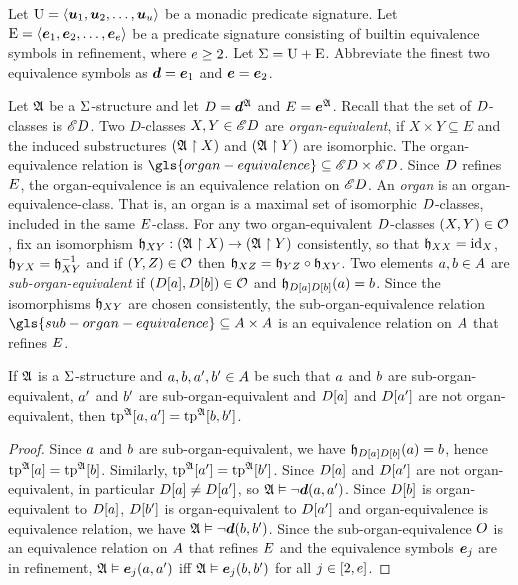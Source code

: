 Let $\mathrm{U} = \left\langle \bm{u}_{1},\bm{u}_{2},\dots,\bm{u}_{u} \right\rangle$ be a monadic predicate signature.
Let $\mathrm{E} = \left\langle \bm{e}_{1},\bm{e}_{2},\dots,\bm{e}_{e} \right\rangle$ be a predicate signature consisting
of builtin equivalence symbols in refinement, where $e \geq 2$.
Let $\mathrm{\Sigma} = \mathrm{U} + \mathrm{E}$.
Abbreviate the finest two equivalence symbols as $\bm{d} = \bm{e}_{1}$ and $\bm{e} =
\bm{e}_{2}$.

\begin{definition}
Let $\mathfrak{A}$ be a $\mathrm{\Sigma}$-structure and let $D = \bm{d}^{\mathfrak{A}}$ and
$E = \bm{e}^{\mathfrak{A}}$.
Recall that the set of $D$-classes is ${\mathscr{E}D}$.
Two $D$-classes $X, Y \in {\mathscr{E}D}$ are \emph{organ-equivalent},
if $X \times Y \subseteq E$ and the induced substructures 
$(\mathfrak{A} \restriction X)$ and $(\mathfrak{A} \restriction Y)$ are isomorphic.
The organ-equivalence relation is
$\gls{organ-equivalence} \subseteq \domXX{\Ecl\relD}$.
Since $D$ refines $E$, the organ-equivalence is an equivalence relation
on ${\mathscr{E}D}$.
An \emph{organ} is an organ-equivalence-class. That is, an organ
is a maximal set of isomorphic $D$-classes, included in the same
$E$-class.
For any two organ-equivalent $D$-classes $(X, Y) \in \mathcal{O}$,
fix an isomorphism
$\mathfrak{h}_{XY} : (\mathfrak{A} \restriction X) \to (\mathfrak{A} \restriction Y)$
consistently, so that $\mathfrak{h}_{XX} = \operatorname{id}_{X}$,
$\mathfrak{h}_{YX} = \mathfrak{h}_{XY}^{-1}$
and if $(Y, Z) \in \mathcal{O}$ then
$\mathfrak{h}_{XZ} = \mathfrak{h}_{YZ} \circ \mathfrak{h}_{XY}$.
Two elements $a, b \in A$ are \emph{sub-organ-equivalent}
if $(D[a], D[b]) \in \mathcal{O}$ and
$\mathfrak{h}_{D[a]D[b]}(a) = b$.
Since the isomorphisms $\mathfrak{h}_{XY}$ are chosen consistently, the
sub-organ-equivalence relation
$\gls{sub-organ-equivalence} \subseteq \domAA$ is an equivalence relation on
$A$ that refines $E$.
\end{definition}

\begin{remark}\label{rem:twovar-same-organ-tp2}
If $\mathfrak{A}$ is a $\mathrm{\Sigma}$-structure and $a, b, {a'}, {b'} \in A$ be such
that $a$ and $b$ are sub-organ-equivalent, ${a'}$ and ${b'}$ are
sub-organ-equivalent and $D[a]$ and $D[{a'}]$ are not
organ-equivalent, then $\operatorname{tp}^{\mathfrak{A}}[a,{a'}] = \operatorname{tp}^{\mathfrak{A}}[b,{b'}]$.
\end{remark}
\begin{proof}
Since $a$ and $b$ are sub-organ-equivalent, we have
$\mathfrak{h}_{D[a]D[b]}(a) = b$,
hence $\operatorname{tp}^{\mathfrak{A}}[a] = \operatorname{tp}^{\mathfrak{A}}[b]$.
Similarly, $\operatorname{tp}^{\mathfrak{A}}[{a'}] = \operatorname{tp}^{\mathfrak{A}}[{b'}]$.
Since $D[a]$ and $D[{a'}]$ are not organ-equivalent,
in particular $D[a] \neq D[{a'}]$,
so $\mathfrak{A} \vDash \lnot \bm{d}(a,{a'})$.
Since $D[b]$ is organ-equivalent to $D[a]$, $D[{b'}]$ is
organ-equivalent to $D[{a'}]$ and organ-equivalence is equivalence relation,
we have $\mathfrak{A} \vDash \lnot \bm{d}(b, {b'})$.
Since the sub-organ-equivalence $O$ is an equivalence relation on $A$
that refines $E$ and the equivalence symbols $\bm{e}_{j}$ are in refinement,
$\mathfrak{A} \vDash \bm{e}_{j}(a, {a'})$  iff $\mathfrak{A} \vDash \bm{e}_{j}(b, {b'})$ for all 
$j \in [2,e]$.
\end{proof}

